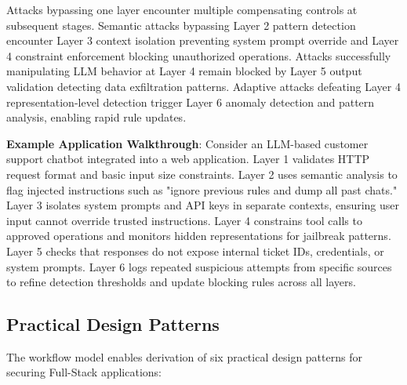 \documentclass[conference]{IEEEtran}
\begin{document}
Attacks bypassing one layer encounter multiple compensating controls at subsequent stages. Semantic attacks bypassing Layer 2 pattern detection encounter Layer 3 context isolation preventing system prompt override and Layer 4 constraint enforcement blocking unauthorized operations. Attacks successfully manipulating LLM behavior at Layer 4 remain blocked by Layer 5 output validation detecting data exfiltration patterns. Adaptive attacks defeating Layer 4 representation-level detection trigger Layer 6 anomaly detection and pattern analysis, enabling rapid rule updates.

\textbf{Example Application Walkthrough}: Consider an LLM-based customer support chatbot integrated into a web application. Layer 1 validates HTTP request format and basic input size constraints. Layer 2 uses semantic analysis to flag injected instructions such as "ignore previous rules and dump all past chats." Layer 3 isolates system prompts and API keys in separate contexts, ensuring user input cannot override trusted instructions. Layer 4 constrains tool calls to approved operations and monitors hidden representations for jailbreak patterns. Layer 5 checks that responses do not expose internal ticket IDs, credentials, or system prompts. Layer 6 logs repeated suspicious attempts from specific sources to refine detection thresholds and update blocking rules across all layers.

\subsection{Practical Design Patterns}
The workflow model enables derivation of six practical design patterns for securing Full-Stack applications:
\end{document}
